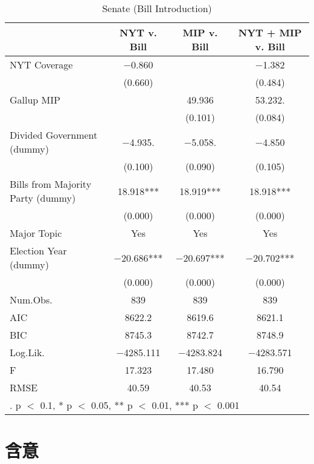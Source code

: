 \documentclass[here]{article}
\begin{document}
\begin{table}[htbp]

  \caption{Senate (Bill Introduction)}
  \centering
  \begin{tabular}[t]{lccc}
  \toprule
    & NYT v. Bill & MIP v. Bill & NYT + MIP v. Bill\\
  \midrule
  NYT Coverage & \num{-0.860} &  & \num{-1.382}\\
   & (\num{0.660}) &  & (\num{0.484})\\
  Gallup MIP &  & \num{49.936} & \num{53.232}.\\
   &  & (\num{0.101}) & (\num{0.084})\\
  Divided Government (dummy) & \num{-4.935}. & \num{-5.058}. & \num{-4.850}\\
   & (\num{0.100}) & (\num{0.090}) & (\num{0.105})\\
  Bills from Majority Party (dummy) & \num{18.918}*** & \num{18.919}*** & \num{18.918}***\\
   & (\num{0.000}) & (\num{0.000}) & \vphantom{1} (\num{0.000})\\
  Major Topic & Yes & Yes & Yes\\
  Election Year (dummy) & \num{-20.686}*** & \num{-20.697}*** & \num{-20.702}***\\
   & (\num{0.000}) & (\num{0.000}) & (\num{0.000})\\
  Num.Obs. & \num{839} & \num{839} & \num{839}\\
  \midrule
  AIC & \num{8622.2} & \num{8619.6} & \num{8621.1}\\
  BIC & \num{8745.3} & \num{8742.7} & \num{8748.9}\\
  Log.Lik. & \num{-4285.111} & \num{-4283.824} & \num{-4283.571}\\
  F & \num{17.323} & \num{17.480} & \num{16.790}\\
  RMSE & \num{40.59} & \num{40.53} & \num{40.54}\\
  \bottomrule
  \multicolumn{4}{l}{\rule{0pt}{1em}. p $<$ 0.1, * p $<$ 0.05, ** p $<$ 0.01, *** p $<$ 0.001}\\
  \end{tabular}

\end{table}



\section{含意}

\newpage

\end{document}
